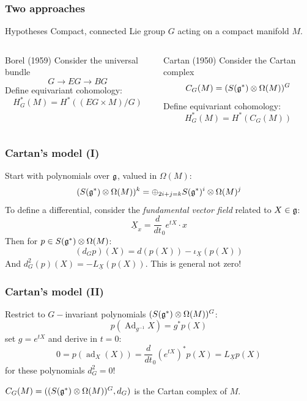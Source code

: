 \documentclass{beamer}
\DeclareMathOperator{\Ad}{Ad}
\DeclareMathOperator{\ad}{ad}
\begin{document}
\begin{frame}
\frametitle{Two approaches}
\begin{block}{Hypotheses}
Compact, connected Lie group $G$ acting on a compact manifold $M$.
\end{block}
\begin{columns}[t] %

\begin{block}{Borel (1959)}
Consider the universal bundle
\[
G\to EG \to BG
\]
Define equivariant cohomology:
\[
H_G^*(M)=H^*((EG\times M)/G)
\]
\end{block}

\begin{block}{Cartan (1950)}
Consider the Cartan complex
\[
C_G(M)=(S(\frak g^*)\otimes\Omega(M))^G
\]
Define equivariant cohomology:
\[
H_G^*(M)=H^*(C_G(M))
\]
\end{block}
\end{columns}
\end{frame}




\begin{frame}
\frametitle{Cartan's model (I)}
Start with polynomials over $\frak g$, valued in $\Omega(M)$:
\[
(S(\frak g^*)\otimes \Omega(M))^k=\oplus_{2i+j=k}S(\frak g^*)^i\otimes \Omega(M)^j
\]
To define a differential, consider the \emph{fundamental vector field} related to $X\in\frak g$:
\[
\underline X_x=\frac{d}{dt}_0e^{tX}\cdot x
\]
Then for $p\in S(\frak g^*)\otimes \Omega(M)$:
\[
(d_Gp)(X)=d(p(X))-\iota_{\underline X}(p(X))
\]
And $d^2_G(p)(X)=-L_{\underline X}(p(X))$. This is general not zero!
\end{frame}


\begin{frame}
\frametitle{Cartan's model (II)}
Restrict to $G-$invariant polynomials $(S(\frak g^*)\otimes \Omega(M))^G$:
\[
p(\Ad_{g^{-1}}X)=g^*p(X)
\]
set $g=e^{tX}$ and derive in $t=0$:
\[
0=p(\ad_X(X))=\frac{d}{dt}_0(e^{tX})^*p(X)=L_{\underline X}p(X)
\]
for these polynomials $d^2_G=0$!\newline\par
$C_G(M)=((S(\frak g^*)\otimes \Omega(M))^G,d_G)$ is the Cartan complex of $M$.
\end{frame}
\end{document}
